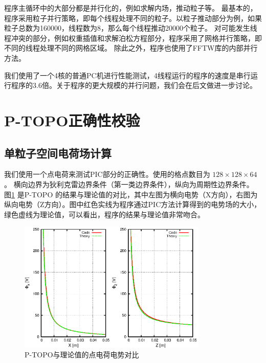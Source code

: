 程序主循环中的大部分都是并行化的，例如求解内场，推动粒子等。
最基本的，程序采用粒子并行策略，即每个线程处理不同的粒子。以粒子推动部分为例，如果粒子总数为160000，线程数为8，那么每个线程推动20000个粒子。
对可能发生线程冲突的部分，例如权重插值和求解泊松方程部分，程序采用了网格并行策略，即不同的线程处理不同的网格区域。
除此之外，程序也使用了FFTW库的内部并行方法。



我们使用了一个4核的普通PC机进行性能测试，4线程运行的程序的速度是串行运行程序的3.6倍。关于程序的更大规模的并行问题，我们会在后文做进一步讨论。

\section{P-TOPO正确性校验}
\subsection{单粒子空间电荷场计算}
我们使用一个点电荷来测试PIC部分的正确性。使用的格点数目为 $128\times128\times64$。 横向边界为狄利克雷边界条件（第一类边界条件），纵向为周期性边界条件。 图\ref{fig:P_TOPO_verification1} 是P-TOPO 的结果与理论值的对比，其中左图为横向电势（X方向），右图为纵向电势（Z方向）。图中红色实线为程序通过PIC方法计算得到的电势场的大小，绿色虚线为理论值，可以看出，程序的结果与理论值非常吻合。

\begin{figure}[!htb]
    \centering
    \includegraphics[width=0.8\textwidth]{Img/P_TOPO_verification1.eps}
    \caption{P-TOPO与理论值的点电荷电势对比}
    \label{fig:P_TOPO_verification1}
\end{figure}

